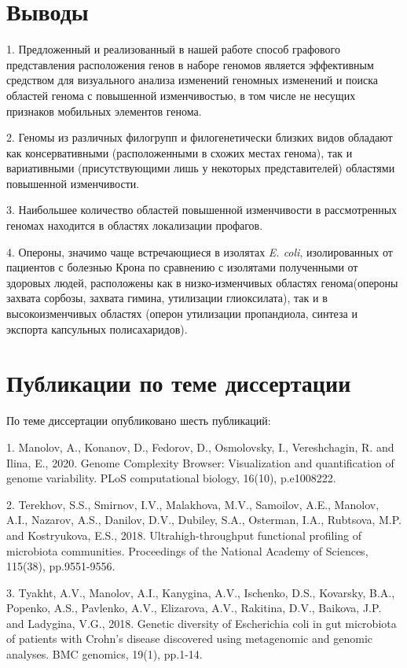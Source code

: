 \chapter{Выводы}

1. Предложенный и реализованный в нашей работе способ графового представления расположения генов в наборе геномов является эффективным средством для визуального анализа изменений геномных изменений и поиска областей генома с повышенной изменчивостью, в том числе не несущих признаков мобильных элементов генома.

2. Геномы из различных филогрупп и филогенетически близких видов обладают как консервативными (расположенными в схожих местах генома), так и вариативными (присутствующими лишь у некоторых представителей) областями повышенной изменчивости.

3. Наибольшее количество областей повышенной изменчивости в рассмотренных геномах находится в областях локализации профагов.

4. Опероны, значимо чаще встречающиеся в изолятах \textit{E. coli}, изолированных от пациентов с болезнью Крона по сравнению с изолятами полученными от здоровых людей, расположены как в низко-изменчивых областях генома(опероны захвата сорбозы, захвата гимина, утилизации глиоксилата), так и в высокоизменчивых областях (оперон утилизации пропандиола, синтеза и экспорта капсульных полисахаридов).

\chapter{Публикации по теме диссертации}
По теме диссертации опубликовано шесть публикаций: 

1. Manolov, A., Konanov, D., Fedorov, D., Osmolovsky, I., Vereshchagin, R. and Ilina, E., 2020. Genome Complexity Browser: Visualization and quantification of genome variability. PLoS computational biology, 16(10), p.e1008222.

2. Terekhov, S.S., Smirnov, I.V., Malakhova, M.V., Samoilov, A.E., Manolov, A.I., Nazarov, A.S., Danilov, D.V., Dubiley, S.A., Osterman, I.A., Rubtsova, M.P. and Kostryukova, E.S., 2018. Ultrahigh-throughput functional profiling of microbiota communities. Proceedings of the National Academy of Sciences, 115(38), pp.9551-9556.

3. Tyakht, A.V., Manolov, A.I., Kanygina, A.V., Ischenko, D.S., Kovarsky, B.A., Popenko, A.S., Pavlenko, A.V., Elizarova, A.V., Rakitina, D.V., Baikova, J.P. and Ladygina, V.G., 2018. Genetic diversity of Escherichia coli in gut microbiota of patients with Crohn’s disease discovered using metagenomic and genomic analyses. BMC genomics, 19(1), pp.1-14.

